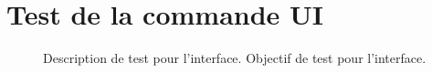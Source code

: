\documentclass{ifri}
\begin{document}
\section{Test de la commande UI}

\begin{figure}[H]
  \centering
     {Description de test pour l'interface.}%
     {Objectif de test pour l'interface.}
\end{figure}
\end{document}
